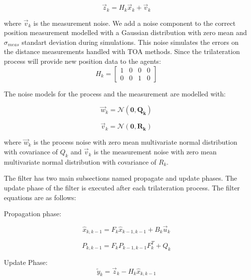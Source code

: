 \begin{equation}
{\vec{z}}_k = H_k {\vec{x}}_k + {\vec{v}}_k
\end{equation}

where ${\vec{v}}_k$ is the measurement noise. We add a noise component to the correct position measurement modelled with a Gaussian distribution with zero mean and $\sigma_{meas}$ standart deviation during simulations. This noise simulates the errors on the distance measurements handled with TOA methods. Since the trilateration process will provide new position data to the agents:
\begin{equation}
H_k = \begin{bmatrix}
1 & 0 & 0 & 0\\
0 & 0 & 1 & 0
\end{bmatrix}
\end{equation}
	
The noise models for the process and the measurement are modelled with:

\begin{equation}
{\vec{w}}_k = \mathcal{N}(\mathbf{0,Q_k})
\end{equation}
	
\begin{equation}
{\vec{v}}_k = \mathcal{N}(\mathbf{0,R_k})
\end{equation}
		
where ${\vec{w}}_k$ is the process noise with zero mean multivariate normal distribution with covariance of $Q_k$ and ${\vec{v}}_k$ is the measurement noise with zero mean multivariate normal distribution with covariance of $R_k$.
		
The filter has two main subsections named propagate and update phases. The update phase of the filter is executed after each trilateration process. The filter equations are as follows:
		
Propagation phase:

\begin{equation}
\hat{x}_{k,k-1} = F_k\hat{x}_{k-1,k-1} + B_k{\vec{u}}_k
\end{equation}
		
\begin{equation}
 P_{k,k-1} = F_k P_{k-1,k-1}F^T_k + Q_k
\end{equation}
		
Update Phase:
\begin{equation}
\tilde{y}_k = {\vec{z}}_k - H_k  \hat{x}_{k,k-1} 
\end{equation}


